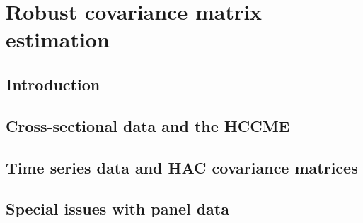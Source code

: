 \chapter{Robust covariance matrix estimation}
\label{chap-robust-vcv}

\section{Introduction}
\label{vcv-intro}

\section{Cross-sectional data and the HCCME}
\label{vcv-hccme}

\section{Time series data and HAC covariance matrices}
\label{vcv-hac}

\section{Special issues with panel data}
\label{sec:vcv-panel}


